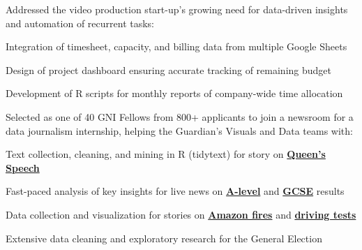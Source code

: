 \documentclass[]{deedy-resume-openfont}
\begin{document}
\begin{minipage}[t]{0.66\textwidth}
Addressed the video production start-up's growing need for data-driven insights and automation of recurrent tasks:
\begin{tightemize}
\item Integration of timesheet, capacity, and billing data from multiple Google Sheets 
\item Design of project dashboard ensuring accurate tracking of remaining budget 
\item Development of R scripts for monthly reports of company-wide time allocation
\end{tightemize}


\sectionsep

Selected as one of 40 GNI Fellows from 800+ applicants to join a newsroom for a data journalism internship, helping the Guardian's Visuals and Data teams with:
\begin{tightemize}
\item Text collection, cleaning, and mining in R (tidytext) for story on \href{https://www.theguardian.com/politics/ng-interactive/2019/oct/14/how-unusual-language-boris-johnson-first-queens-speech}{\bf Queen's Speech}
\item Fast-paced analysis of key insights for live news on \href{https://www.theguardian.com/education/live/2019/aug/15/a-level-results-2019-students-await-results-from-reformed-exams-live?}{\bf A-level} and \href{https://www.theguardian.com/education/live/2019/aug/22/gcse-results-day-2019-live-news}{\bf GCSE} results
\item Data collection and visualization for stories on \href{https://www.theguardian.com/environment/2019/aug/23/amazon-fires-what-is-happening-anything-we-can-do?}{\bf Amazon fires} and \href{https://www.theguardian.com/world/2019/aug/23/an-easy-ride-scottish-village-fuels-debate-driving-test-pass-rates}{\bf driving tests}
\item Extensive data cleaning and exploratory research for the General Election
\end{tightemize}
\sectionsep


\end{minipage}
\end{document}
